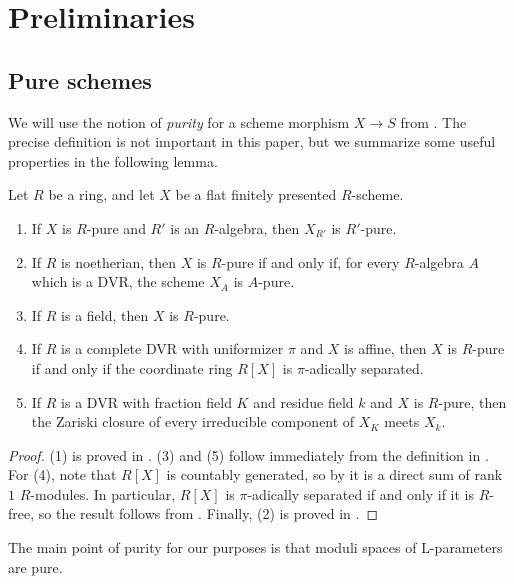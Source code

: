\section{Preliminaries}\label{section:prelim}

\subsection{Pure schemes}\label{ss:pure}

We will use the notion of \textit{purity} for a scheme morphism $X \to S$ from \cite[3.3.3]{Raynaud-Gruson}. The precise definition is not important in this paper, but we summarize some useful properties in the following lemma.

\begin{lemma}\label{lemma:purity-results}
    Let $R$ be a ring, and let $X$ be a flat finitely presented $R$-scheme.
    \begin{enumerate}
        \item If $X$ is $R$-pure and $R'$ is an $R$-algebra, then $X_{R'}$ is $R'$-pure.
        \item If $R$ is noetherian, then $X$ is $R$-pure if and only if, for every $R$-algebra $A$ which is a DVR, the scheme $X_A$ is $A$-pure.
        \item If $R$ is a field, then $X$ is $R$-pure.
        \item If $R$ is a complete DVR with uniformizer $\pi$ and $X$ is affine, then $X$ is $R$-pure if and only if the coordinate ring $R[X]$ is $\pi$-adically separated.
        \item If $R$ is a DVR with fraction field $K$ and residue field $k$ and $X$ is $R$-pure, then the Zariski closure of every irreducible component of $X_K$ meets $X_k$.
    \end{enumerate}
\end{lemma}

\begin{proof}
    (1) is proved in \cite[3.3.7]{Raynaud-Gruson}. (3) and (5) follow immediately from the definition in \cite[3.3.3]{Raynaud-Gruson}. For (4), note that $R[X]$ is countably generated, so by \cite[Thm.\ 12]{Kaplansky} it is a direct sum of rank $1$ $R$-modules. In particular, $R[X]$ is $\pi$-adically separated if and only if it is $R$-free, so the result follows from \cite[3.3.5]{Raynaud-Gruson}. Finally, (2) is proved in \cite[2.2]{Hom-schemes}.
\end{proof}

The main point of purity for our purposes is that moduli spaces of L-parameters are pure.

